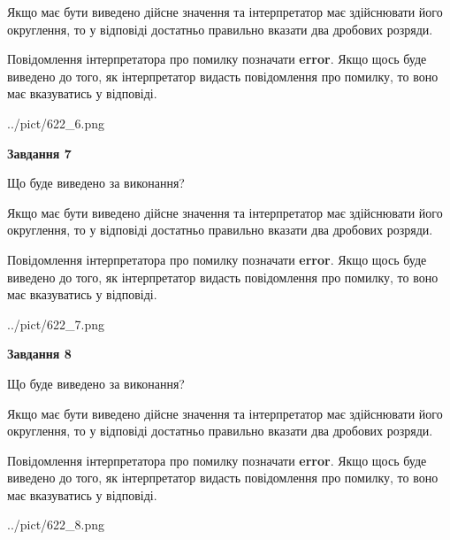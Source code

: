 \documentclass[12pt, ukrainian]{article}
\begin{document}
{\begin {Large}
Якщо має бути виведено дійсне значення та інтерпретатор має здійснювати його округлення, 
то у відповіді достатньо правильно вказати два дробових розряди.

Повідомлення інтерпретатора про помилку позначати \textbf{error}.
Якщо щось буде виведено до того, як інтерпретатор видасть повідомлення про помилку, 
то воно має вказуватись у відповіді. \par

\begin{center}
	{../pict/622_6.png}
\end{center}
\newpage

{\begin {center}\textbf{Завдання 7}\end {center}}\par
Що буде виведено за виконання? \par

Якщо має бути виведено дійсне значення та інтерпретатор має здійснювати його округлення, 
то у відповіді достатньо правильно вказати два дробових розряди.

Повідомлення інтерпретатора про помилку позначати \textbf{error}.
Якщо щось буде виведено до того, як інтерпретатор видасть повідомлення про помилку, 
то воно має вказуватись у відповіді. \par

\begin{center}
	{../pict/622_7.png}
\end{center}
\newpage

{\begin {center}\textbf{Завдання 8}\end {center}}\par
Що буде виведено за виконання? \par

Якщо має бути виведено дійсне значення та інтерпретатор має здійснювати його округлення, 
то у відповіді достатньо правильно вказати два дробових розряди.

Повідомлення інтерпретатора про помилку позначати \textbf{error}.
Якщо щось буде виведено до того, як інтерпретатор видасть повідомлення про помилку, 
то воно має вказуватись у відповіді. \par

\begin{center}
	{../pict/622_8.png}
\end{center}
\newpage


\end{Large}}
\end{document}
